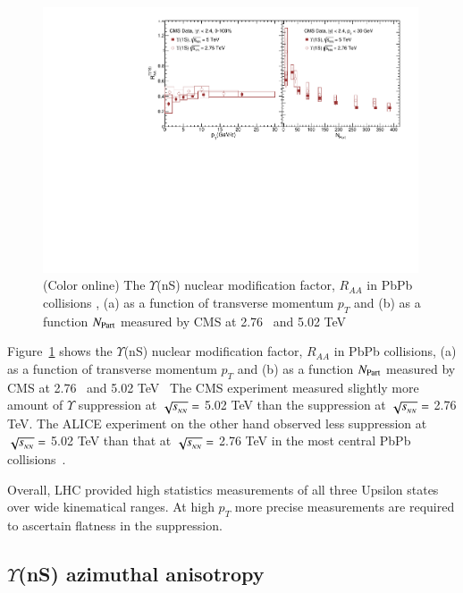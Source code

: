 \begin{figure}
  \includegraphics[width=0.99\textwidth]{Figures/ExpOverview/Fig_CMS_Y1SRAAPtNPart_En.pdf}
  \caption{(Color online) The $\Upsilon$(nS) nuclear modification factor, $R_{AA}$ in PbPb collisions ,
    (a) as a function of transverse momentum $p_{T}$
    and (b) as a function $N_{\rm Part}$ measured by CMS 
    at 2.76~\cite{Khachatryan:2016xxp} and 5.02 TeV~\cite{CMS:2018zza}
  }
  \label{fig:LHCYnSRAAenergy}
\end{figure}




Figure~\ref{fig:LHCYnSRAAenergy} shows 
the $\Upsilon$(nS) nuclear modification factor, $R_{AA}$ in PbPb collisions,
(a) as a function of transverse momentum $p_{T}$
  and (b) as a function $N_{\rm Part}$ measured by CMS
    at 2.76~\cite{Khachatryan:2016xxp} and 5.02 TeV~\cite{CMS:2018zza}
 The CMS experiment measured slightly more amount of $\Upsilon$ suppression at
 $\sqrt{s_{_{NN}}} =$ 5.02 TeV than the suppression at $\sqrt{s_{_{NN}}} =$ 2.76 TeV.
 The ALICE experiment on the other hand observed less
suppression at $\sqrt{s_{_{NN}}} =$ 5.02 TeV than that at $\sqrt{s_{_{NN}}} =$ 2.76 TeV 
in the most central PbPb collisions~\cite{Abelev:2014nua,ALICE:2018wzm}. 
  
Overall, LHC provided high statistics measurements of all three
Upsilon states over wide kinematical ranges. At high $p_T$ more precise
measurements are required to ascertain flatness in the suppression. 


    
    
\subsection{$\Upsilon$(nS) azimuthal anisotropy}


